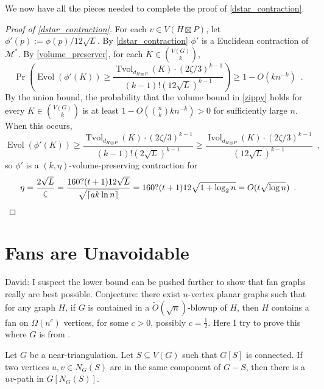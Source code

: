 \documentclass{patmorin}
\renewcommand{\ge}{\geqslant}
\newcommand{\david}[1]{{\color{orange} David: #1}}
\DeclareMathOperator{\evol}{Evol}
\DeclareMathOperator{\ivol}{Ivol}
\DeclareMathOperator{\tvol}{Tvol}
\begin{document}
We now have all the pieces needed to complete the proof of \cref{dstar_contraction}.

\begin{proof}[Proof of \cref{dstar_contraction}]
  For each $v\in V(H\boxtimes P)$, let $\phi'(p):=\phi(p)/12\sqrt{L}$. By \cref{dstar_contraction} $\phi'$ is a Euclidean contraction of $\mathcal{M}^*$.  By \cref{volume_preserver}, for each $K\in \binom{V(G)}{k}$,
  \begin{equation}
    \Pr\left(\evol(\phi'(K)) \ge \frac{\tvol_{d_{H\boxtimes P}}(K)\cdot(2\zeta/3)^{k-1}}{(k-1)!(12\sqrt{L})^{k-1}}\right) \ge 1- O(kn^{-k}) \enspace .
    \label{zippy}
  \end{equation}
  By the union bound, the probability that the volume bound in \cref{zippy} holds for every $K\in\binom{V(G)}{k}$ is at least $1-O(\binom{n}{k}kn^{-k}) > 0$ for sufficiently large $n$.  When this occurs,
  \[
    \evol(\phi'(K)) \ge \frac{\tvol_{d_{H\boxtimes P}}(K)\cdot(2\zeta/3)^{k-1}}{(k-1)!(2\sqrt{L})^{k-1}} \ge
    \frac{\ivol_{d_{H\boxtimes P}}(K)\cdot(2\zeta/3)^{k-1}}{(12\sqrt{L})^{k-1}} \enspace ,
  \]
  so $\phi'$ is a $(k,\eta)$-volume-preserving contraction for
  \[
    \eta = \frac{2\sqrt{L}}{\zeta} = \frac{160?(t+1)12\sqrt{L}}{\sqrt{\lceil ak\ln n\rceil}} = {160?(t+1)12\sqrt{1+\log_2 n}} = O(t\sqrt{\log n}) \enspace . \qedhere
  \]
\end{proof}


\section{Fans are Unavoidable}
\david{I suspect the lower bound can be pushed further to show  that fan graphs really are best possible. Conjecture: there exist $n$-vertex planar graphs such that for any graph $H$, if $G$ is contained in  a $\tilde{O}(\sqrt{n})$-blowup of $H$, then $H$ contains a fan on $\Omega(n^c)$ vertices, for some $c>0$, possibly $c=\frac12$. Here I try to prove this where $G$ is from \citep{LMST08}. }

\begin{lem}
\label{FindPath}
Let $G$ be a near-triangulation. Let $S\subseteq V(G)$ such that $G[S]$ is connected. If two vertices $u,v\in N_G(S)$ are in the same component of $G-S$, then there is a $uv$-path in $G[ N_G(S) ]$.
\end{lem}
\end{document}
